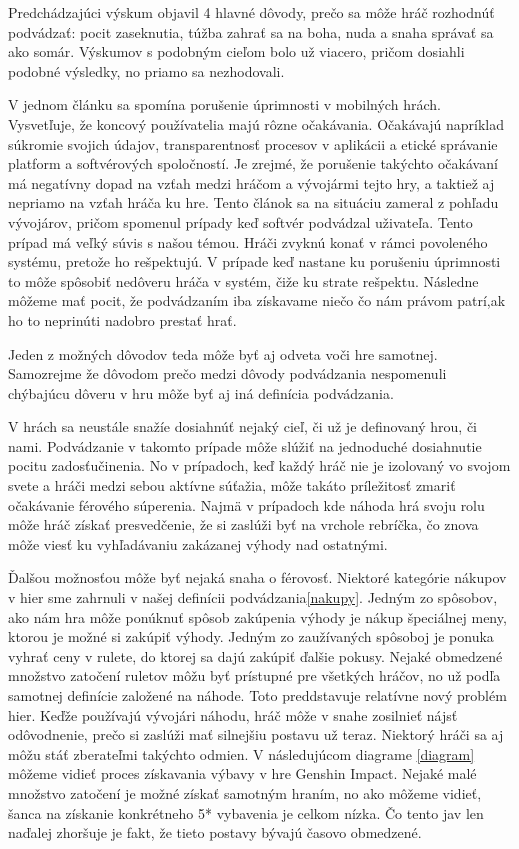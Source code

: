 \documentclass[10pt, oneside, slovak,a4paper]{article}
\begin{document}
Predchádzajúci výskum objavil 4 hlavné dôvody, prečo sa môže hráč rozhodnúť podvádzať: pocit zaseknutia, túžba zahrať sa na boha, nuda a snaha správať sa ako somár.\cite{Consalvo} Výskumov s podobným cieľom bolo už viacero, pričom dosiahli podobné výsledky, no priamo sa nezhodovali. 

V jednom článku sa spomína porušenie úprimnosti v mobilných hrách. Vysvetľuje, že koncový používatelia majú rôzne očakávania. Očakávajú napríklad súkromie svojich údajov, transparentnosť procesov v aplikácii a etické správanie platform a softvérových spoločností\cite{FirstLook}. Je zrejmé, že porušenie takýchto očakávaní má negatívny dopad na vzťah medzi hráčom a vývojármi tejto hry, a taktiež aj nepriamo na vzťah hráča ku hre\cite{honesty}. Tento článok sa na situáciu zameral z pohľadu vývojárov, pričom spomenul prípady keď softvér podvádzal uživateľa. Tento prípad má veľký súvis s našou témou. Hráči zvyknú konať v rámci povoleného systému, pretože ho rešpektujú. V prípade keď nastane ku porušeniu úprimnosti to môže spôsobiť nedôveru hráča v systém, čiže ku strate rešpektu. Následne môžeme mať pocit, že podvádzaním iba získavame niečo čo nám právom patrí,ak ho to neprinúti nadobro prestať hrať.

Jeden z možných dôvodov teda môže byť aj odveta voči hre samotnej. Samozrejme že dôvodom prečo medzi dôvody podvádzania nespomenuli chýbajúcu dôveru v hru môže byť aj iná definícia podvádzania.

V hrách sa neustále snažíe dosiahnúť nejaký cieľ, či už je definovaný hrou, či nami. Podvádzanie v takomto prípade môže slúžiť na jednoduché dosiahnutie pocitu zadosťučinenia. No v prípadoch, keď každý hráč nie je izolovaný vo svojom svete a hráči medzi sebou aktívne súťažia, môže takáto príležitosť zmariť očakávanie férového súperenia. Najmä v prípadoch kde náhoda hrá svoju rolu môže hráč získať presvedčenie, že si zaslúži byť na vrchole rebríčka, čo znova môže viesť ku vyhľadávaniu zakázanej výhody nad ostatnými.

Ďalšou možnosťou môže byť nejaká snaha o férovosť. Niektoré kategórie nákupov v hier sme zahrnuli v našej definícii podvádzania\ref{nakupy}. Jedným zo spôsobov, ako nám hra môže ponúknuť spôsob zakúpenia výhody je nákup špeciálnej meny, ktorou je možné si zakúpiť výhody. Jedným zo zaužívaných spôsoboj je ponuka vyhrať ceny v rulete, do ktorej sa dajú zakúpiť ďalšie pokusy. Nejaké obmedzené množstvo zatočení ruletov môžu byť prístupné pre všetkých hráčov, no už podľa samotnej definície založené na náhode. Toto preddstavuje relatívne nový problém hier. Keďže používajú vývojári náhodu, hráč môže v snahe zosilnieť nájsť odôvodnenie, prečo si zaslúži mať silnejšiu postavu už teraz. Niektorý hráči sa aj môžu stáť zberateľmi takýchto odmien. V následujúcom diagrame \ref{diagram} môžeme vidieť proces získavania výbavy v hre Genshin Impact. Nejaké malé množstvo zatočení je možné získať samotným hraním, no ako môžeme vidieť, šanca na získanie konkrétneho 5* vybavenia je celkom nízka. Čo tento jav len naďalej zhoršuje je fakt, že tieto postavy bývajú časovo obmedzené.
\end{document}
